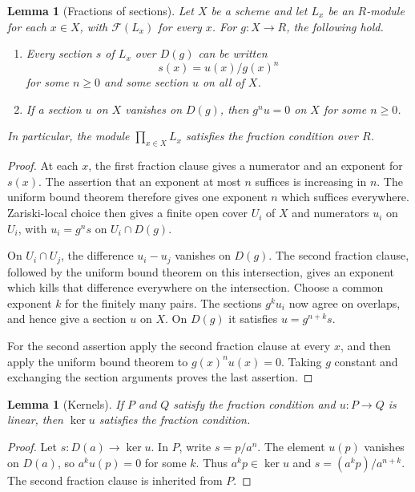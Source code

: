 \documentclass[11pt]{amsart}
\newtheorem{lemma}[theorem]{Lemma}
\theoremstyle{definition}
\newcommand{\Frac}{\mathcal F}
\begin{document}
\begin{lemma}[Fractions of sections]\label{lem:sections}
Let $X$ be a scheme and let $L_x$ be an $R$-module for each $x\in X$,
with $\Frac(L_x)$ for every $x$. For $g:X\to R$, the following hold.
\begin{enumerate}
\item Every section $s$ of $L_x$ over $D(g)$ can be written
  \[
   s(x)=u(x)/g(x)^n
  \]
  for some $n\geq0$ and some section $u$ on all of $X$.
\item If a section $u$ on $X$ vanishes on $D(g)$, then
  $g^nu=0$ on $X$ for some $n\geq0$.
\end{enumerate}
In particular, the module $\prod_{x\in X}L_x$ satisfies the fraction
condition over $R$.
\end{lemma}
\begin{proof}
At each $x$, the first fraction clause gives a numerator and an exponent
for $s(x)$. The assertion that an exponent at most $n$ suffices is
increasing in $n$. The uniform bound theorem therefore gives one
exponent $n$ which suffices everywhere. Zariski-local choice then gives
a finite open cover $U_i$ of $X$ and numerators $u_i$ on $U_i$, with
$u_i=g^ns$ on $U_i\cap D(g)$.

On $U_i\cap U_j$, the difference $u_i-u_j$ vanishes on $D(g)$. The
second fraction clause, followed by the uniform bound theorem on this
intersection, gives an exponent which kills that difference everywhere
on the intersection. Choose a common exponent $k$ for the finitely many
pairs. The sections $g^ku_i$ now agree on overlaps, and hence give a
section $u$ on $X$. On $D(g)$ it satisfies $u=g^{n+k}s$.

For the second assertion apply the second fraction clause at every
$x$, and then apply the uniform bound theorem to $g(x)^nu(x)=0$.
Taking $g$ constant and exchanging the section arguments proves the
last assertion.
\end{proof}

\begin{lemma}[Kernels]\label{lem:kernel}
If $P$ and $Q$ satisfy the fraction condition and $u:P\to Q$ is linear,
then $\ker u$ satisfies the fraction condition.
\end{lemma}
\begin{proof}
Let $s:D(a)\to\ker u$. In $P$, write $s=p/a^n$. The element $u(p)$
vanishes on $D(a)$, so $a^ku(p)=0$ for some $k$. Thus $a^kp\in\ker u$
and $s=(a^kp)/a^{n+k}$. The second fraction clause is inherited from $P$.
\end{proof}
\end{document}

